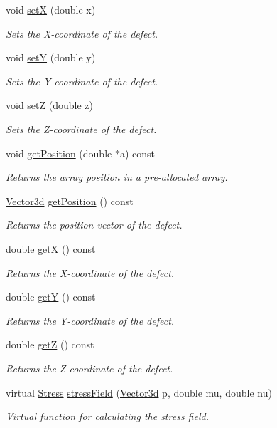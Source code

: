 \begin{DoxyCompactItemize}
void \hyperlink{classDefect_a5a65f73da6a572d9e7109b31239e441d}{set\-X} (double x)
\begin{DoxyCompactList}\small\item\em Sets the X-\/coordinate of the defect. \end{DoxyCompactList}\item 
void \hyperlink{classDefect_a268606391a4eaee3de029d2005648b6f}{set\-Y} (double y)
\begin{DoxyCompactList}\small\item\em Sets the Y-\/coordinate of the defect. \end{DoxyCompactList}\item 
void \hyperlink{classDefect_abb0b16c44a1b04d782f5c5f598b49d5b}{set\-Z} (double z)
\begin{DoxyCompactList}\small\item\em Sets the Z-\/coordinate of the defect. \end{DoxyCompactList}\item 
void \hyperlink{classDefect_a2bfcc6736a19eb9c4c8803ea0ea1e3f7}{get\-Position} (double $\ast$a) const 
\begin{DoxyCompactList}\small\item\em Returns the array position in a pre-\/allocated array. \end{DoxyCompactList}\item 
\hyperlink{classVector3d}{Vector3d} \hyperlink{classDefect_ad175c3f2b1fad6be48806dab69dfb32e}{get\-Position} () const 
\begin{DoxyCompactList}\small\item\em Returns the position vector of the defect. \end{DoxyCompactList}\item 
double \hyperlink{classDefect_a6e331ddeabd92e2edc124e6697d3bf7d}{get\-X} () const 
\begin{DoxyCompactList}\small\item\em Returns the X-\/coordinate of the defect. \end{DoxyCompactList}\item 
double \hyperlink{classDefect_ae307725c160984f44832fce5af896789}{get\-Y} () const 
\begin{DoxyCompactList}\small\item\em Returns the Y-\/coordinate of the defect. \end{DoxyCompactList}\item 
double \hyperlink{classDefect_a56e4a61e93d01dd765a921e3828af6c4}{get\-Z} () const 
\begin{DoxyCompactList}\small\item\em Returns the Z-\/coordinate of the defect. \end{DoxyCompactList}\item 
virtual \hyperlink{classStress}{Stress} \hyperlink{classDefect_a5730a89ce804d75090c9fa35ffdfefa2}{stress\-Field} (\hyperlink{classVector3d}{Vector3d} p, double mu, double nu)
\begin{DoxyCompactList}\small\item\em Virtual function for calculating the stress field. \end{DoxyCompactList}\end{DoxyCompactItemize}

